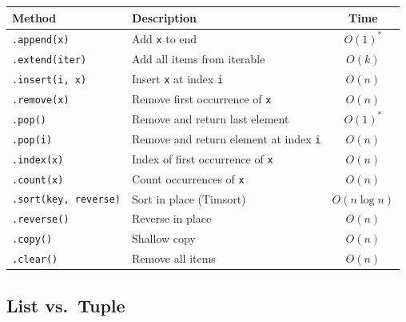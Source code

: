 \documentclass[oneside]{book}
\begin{document}
\begin{center}
\begin{tabularx}{\linewidth}{lXc}
\toprule
\textbf{Method} & \textbf{Description} & \textbf{Time} \\
\midrule
\texttt{.append(x)}          & Add \texttt{x} to end                       & $O(1)^*$ \\
\texttt{.extend(iter)}       & Add all items from iterable                 & $O(k)$ \\
\texttt{.insert(i, x)}       & Insert \texttt{x} at index \texttt{i}       & $O(n)$ \\
\texttt{.remove(x)}          & Remove first occurrence of \texttt{x}       & $O(n)$ \\
\texttt{.pop()}              & Remove and return last element              & $O(1)^*$ \\
\texttt{.pop(i)}             & Remove and return element at index \texttt{i} & $O(n)$ \\
\texttt{.index(x)}           & Index of first occurrence of \texttt{x}     & $O(n)$ \\
\texttt{.count(x)}           & Count occurrences of \texttt{x}             & $O(n)$ \\
\texttt{.sort(key, reverse)} & Sort in place (Timsort)                     & $O(n \log n)$ \\
\texttt{.reverse()}          & Reverse in place                            & $O(n)$ \\
\texttt{.copy()}             & Shallow copy                                & $O(n)$ \\
\texttt{.clear()}            & Remove all items                            & $O(n)$ \\
\bottomrule
\end{tabularx}
\end{center}


\subsection*{List vs.\ Tuple}
\end{document}
